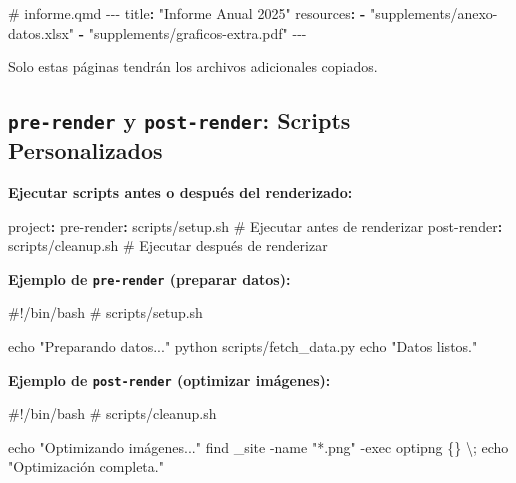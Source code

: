 \documentclass[
  doc,
  floatsintext,
  longtable,
  a4paper,
  nolmodern,
  notxfonts,
  notimes,
  12pt,
  colorlinks=true,linkcolor=blue,citecolor=blue,urlcolor=blue]{apa7}
\newenvironment{Shaded}{\begin{snugshade}}{\end{snugshade}}
\newcommand{\AttributeTok}[1]{\textcolor[rgb]{0.40,0.45,0.13}{#1}}
\newcommand{\BuiltInTok}[1]{\textcolor[rgb]{0.00,0.23,0.31}{#1}}
\newcommand{\CommentTok}[1]{\textcolor[rgb]{0.37,0.37,0.37}{#1}}
\newcommand{\DataTypeTok}[1]{\textcolor[rgb]{0.68,0.00,0.00}{#1}}
\newcommand{\ExtensionTok}[1]{\textcolor[rgb]{0.00,0.23,0.31}{#1}}
\newcommand{\FunctionTok}[1]{\textcolor[rgb]{0.28,0.35,0.67}{#1}}
\newcommand{\KeywordTok}[1]{\textcolor[rgb]{0.00,0.23,0.31}{\textbf{#1}}}
\newcommand{\NormalTok}[1]{\textcolor[rgb]{0.00,0.23,0.31}{#1}}
\newcommand{\PreprocessorTok}[1]{\textcolor[rgb]{0.68,0.00,0.00}{#1}}
\newcommand{\StringTok}[1]{\textcolor[rgb]{0.13,0.47,0.30}{#1}}
\begin{document}
\begin{Shaded}
\begin{Highlighting}[]
\CommentTok{\# informe.qmd}
\PreprocessorTok{{-}{-}{-}}
\FunctionTok{title}\KeywordTok{:}\AttributeTok{ }\StringTok{"Informe Anual 2025"}
\FunctionTok{resources}\KeywordTok{:}
\AttributeTok{  }\KeywordTok{{-}}\AttributeTok{ }\StringTok{"supplements/anexo{-}datos.xlsx"}
\AttributeTok{  }\KeywordTok{{-}}\AttributeTok{ }\StringTok{"supplements/graficos{-}extra.pdf"}
\PreprocessorTok{{-}{-}{-}}
\end{Highlighting}
\end{Shaded}

Solo estas páginas tendrán los archivos adicionales copiados.

\subsection{\texorpdfstring{\texttt{pre-render} y \texttt{post-render}:
Scripts
Personalizados}{pre-render y post-render: Scripts Personalizados}}\label{pre-render-y-post-render-scripts-personalizados}

\textbf{Ejecutar scripts antes o después del renderizado:}

\begin{Shaded}
\begin{Highlighting}[]
\FunctionTok{project}\KeywordTok{:}
\AttributeTok{  }\FunctionTok{pre{-}render}\KeywordTok{:}\AttributeTok{ scripts/setup.sh}\CommentTok{         \# Ejecutar antes de renderizar}
\AttributeTok{  }\FunctionTok{post{-}render}\KeywordTok{:}\AttributeTok{ scripts/cleanup.sh}\CommentTok{      \# Ejecutar después de renderizar}
\end{Highlighting}
\end{Shaded}

\textbf{Ejemplo de \texttt{pre-render} (preparar datos):}

\begin{Shaded}
\begin{Highlighting}[]
\CommentTok{\#!/bin/bash}
\CommentTok{\# scripts/setup.sh}

\BuiltInTok{echo} \StringTok{"Preparando datos..."}
\ExtensionTok{python}\NormalTok{ scripts/fetch\_data.py}
\BuiltInTok{echo} \StringTok{"Datos listos."}
\end{Highlighting}
\end{Shaded}

\textbf{Ejemplo de \texttt{post-render} (optimizar imágenes):}

\begin{Shaded}
\begin{Highlighting}[]
\CommentTok{\#!/bin/bash}
\CommentTok{\# scripts/cleanup.sh}

\BuiltInTok{echo} \StringTok{"Optimizando imágenes..."}
\FunctionTok{find}\NormalTok{ \_site }\AttributeTok{{-}name} \StringTok{"*.png"} \AttributeTok{{-}exec}\NormalTok{ optipng \{\} }\DataTypeTok{\textbackslash{};}
\BuiltInTok{echo} \StringTok{"Optimización completa."}
\end{Highlighting}
\end{Shaded}
\end{document}
